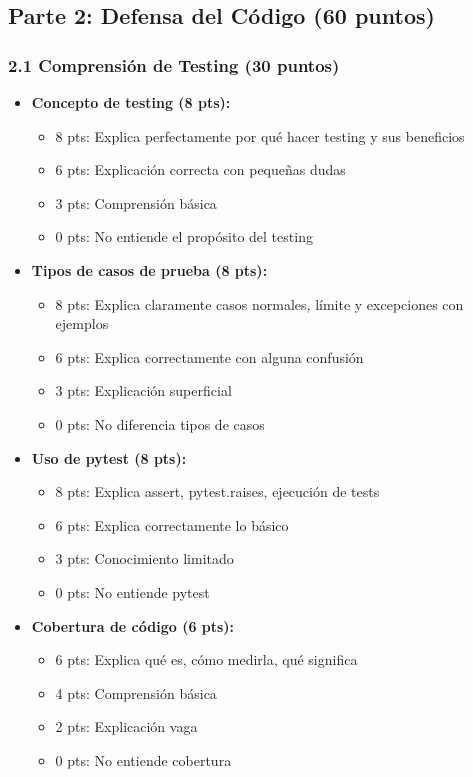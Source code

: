\documentclass[12pt,a4paper]{article}
\begin{document}
\subsection{Parte 2: Defensa del Código (60 puntos)}

\subsubsection{2.1 Comprensión de Testing (30 puntos)}

\begin{itemize}[leftmargin=*]
    \item \textbf{Concepto de testing (8 pts):}
    \begin{itemize}
        \item 8 pts: Explica perfectamente por qué hacer testing y sus beneficios
        \item 6 pts: Explicación correcta con pequeñas dudas
        \item 3 pts: Comprensión básica
        \item 0 pts: No entiende el propósito del testing
    \end{itemize}
    
    \item \textbf{Tipos de casos de prueba (8 pts):}
    \begin{itemize}
        \item 8 pts: Explica claramente casos normales, límite y excepciones con ejemplos
        \item 6 pts: Explica correctamente con alguna confusión
        \item 3 pts: Explicación superficial
        \item 0 pts: No diferencia tipos de casos
    \end{itemize}
    
    \item \textbf{Uso de pytest (8 pts):}
    \begin{itemize}
        \item 8 pts: Explica assert, pytest.raises, ejecución de tests
        \item 6 pts: Explica correctamente lo básico
        \item 3 pts: Conocimiento limitado
        \item 0 pts: No entiende pytest
    \end{itemize}
    
    \item \textbf{Cobertura de código (6 pts):}
    \begin{itemize}
        \item 6 pts: Explica qué es, cómo medirla, qué significa
        \item 4 pts: Comprensión básica
        \item 2 pts: Explicación vaga
        \item 0 pts: No entiende cobertura
    \end{itemize}
\end{itemize}
\end{document}
